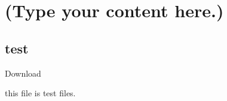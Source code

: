 \documentclass{book}
\begin{document}
\chapter{(Type your content here.)}
\section{test}

Download 

this file is test files.
\end{document}
